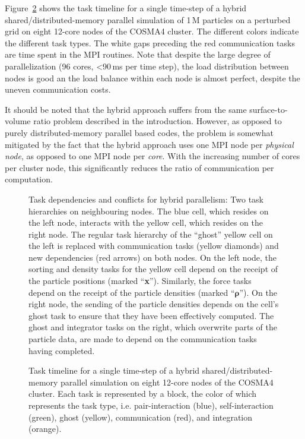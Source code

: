 \documentclass[final]{siamltex}
\newcommand{\fig}[1]
    {Figure~\ref{fig:#1}}
\begin{document}
\fig{TaskPlot} shows the task timeline for a single time-step of a hybrid
shared/distributed-memory parallel simulation of 1\,M particles on a
perturbed grid on eight 12-core nodes of the COSMA4 cluster.
The different colors indicate the different task types.
The white gaps preceding the red communication tasks are time spent
in the MPI routines.
Note that despite the large degree of parallelization (96 cores, <90\,ms
per time step), the load distribution between nodes is good an the
load balance within each node is almost perfect, despite the uneven
communication costs.
        
It should be noted that the hybrid approach suffers from the
same surface-to-volume ratio problem described in the introduction.
However, as opposed to purely distributed-memory parallel based
codes, the problem is somewhat mitigated by the fact that
the hybrid approach uses one MPI node per {\em physical node},
as opposed to one MPI node per {\em core}.
With the increasing number of cores per cluster node,
this significantly reduces the ratio of communication per
computation.


\begin{figure}
    \centerline{}
    
    \caption{Task dependencies and conflicts for hybrid parallelism:
        Two task hierarchies on neighbouring nodes.
        The blue cell, which resides on the left node, interacts
        with the yellow cell, which resides on the right node.
        The regular task hierarchy of the ``ghost'' yellow cell on the
        left is replaced with communication tasks (yellow diamonds)
        and new dependencies (red arrows) on both nodes.
        On the left node, the sorting and density tasks for the yellow cell
        depend on the receipt of the particle positions (marked ``{\bf x}'').
        Similarly, the force tasks depend on the receipt of the
        particle densities (marked ``$\boldsymbol\rho$'').
        On the right node, the sending of the particle densities
        depends on the cell's ghost task to ensure that they have
        been effectively computed.
        The ghost and integrator tasks on the right, which overwrite
        parts of the particle data, are made
        to depend on the communication tasks having completed.
        }
    \label{fig:Hierarchy3}
\end{figure}

\begin{figure}
    \centerline{}
    \caption{Task timeline for a single time-step of a hybrid
        shared/distributed-memory parallel simulation on
        eight 12-core nodes of the COSMA4 cluster.
        Each task is represented by a block, the color of which represents
        the task type, i.e. pair-interaction (blue), self-interaction (green),
        ghost (yellow), communication (red), and integration (orange).}
    \label{fig:TaskPlot}
\end{figure}
\end{document}
